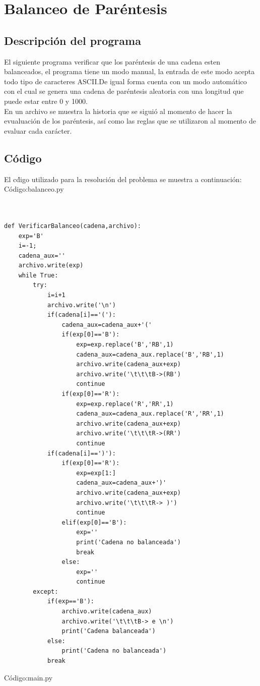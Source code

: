\section{Balanceo de Par\'entesis}
\subsection{ Descripci\'on del programa}
\justify
El siguiente programa verificar que los par\'entesis de una cadena esten balanceados, el programa tiene un modo manual, la entrada de este modo acepta todo tipo de caracteres ASCII.De igual forma cuenta con un modo autom\'atico con el cual se genera una cadena de par\'entesis aleatoria con una longitud que puede estar entre 0 y 1000.\\
En un archivo se muestra la historia que se sigui\'o al momento de hacer la evualuaci\'on de los par\'entesis, as\'i como las reglas que se utilizaron al momento de evaluar cada car\'acter.\\
\subsection{C\'odigo}
El c\'digo utilizado para la resoluci\'on del problema se muestra a continuaci\'on:\\

C\'odigo:balanceo.py

\lstset{language=Python, breaklines=true, basicstyle=\footnotesize}
\begin{lstlisting}[frame=single]
	

def VerificarBalanceo(cadena,archivo):
    exp='B'
    i=-1;
    cadena_aux=''
    archivo.write(exp)
    while True:
        try:
            i=i+1
            archivo.write('\n')
            if(cadena[i]=='('):
                cadena_aux=cadena_aux+'('
                if(exp[0]=='B'):
                    exp=exp.replace('B','RB',1)
                    cadena_aux=cadena_aux.replace('B','RB',1)
                    archivo.write(cadena_aux+exp)
                    archivo.write('\t\t\tB->(RB')
                    continue
                if(exp[0]=='R'):
                    exp=exp.replace('R','RR',1)
                    cadena_aux=cadena_aux.replace('R','RR',1)
                    archivo.write(cadena_aux+exp)
                    archivo.write('\t\t\tR->(RR')
                    continue
            if(cadena[i]==')'):
                if(exp[0]=='R'):
                    exp=exp[1:]
                    cadena_aux=cadena_aux+')'
                    archivo.write(cadena_aux+exp)
                    archivo.write('\t\t\tR-> )')
                    continue
                elif(exp[0]=='B'):
                    exp=''
                    print('Cadena no balanceada')
                    break
                else:
                    exp=''
                    continue
        except:
            if(exp=='B'):
                archivo.write(cadena_aux)
                archivo.write('\t\t\tB-> e \n')
                print('Cadena balanceada')
            else:
                print('Cadena no balanceada')
            break

\end{lstlisting}
\vspace{1.5cm}
C\'odigo:main.py

